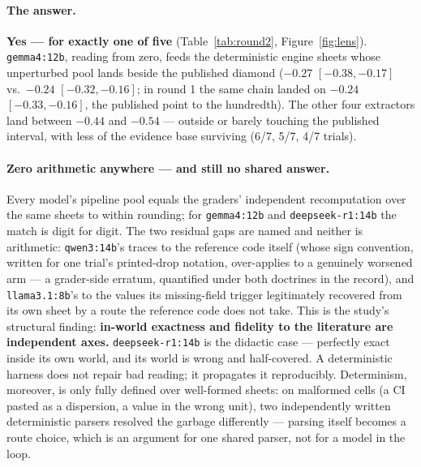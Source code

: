 \documentclass[11pt]{article}
\begin{document}
\paragraph{The answer.} \textbf{Yes --- for exactly one of five} (Table~\ref{tab:round2}, Figure~\ref{fig:lens}). \texttt{gemma4:12b}, reading from zero, feeds the deterministic engine sheets whose unperturbed pool lands beside the published diamond ($-0.27$ $[-0.38, -0.17]$ vs.\ $-0.24$ $[-0.32, -0.16]$; in round 1 the same chain landed on $-0.24$ $[-0.33, -0.16]$, the published point to the hundredth). The other four extractors land between $-0.44$ and $-0.54$ --- outside or barely touching the published interval, with less of the evidence base surviving (6/7, 5/7, 4/7 trials).

\paragraph{Zero arithmetic anywhere --- and still no shared answer.} Every model's pipeline pool equals the graders' independent recomputation over the same sheets to within rounding; for \texttt{gemma4:12b} and \texttt{deepseek-r1:14b} the match is digit for digit. The two residual gaps are named and neither is arithmetic: \texttt{qwen3:14b}'s traces to the reference code itself (whose sign convention, written for one trial's printed-drop notation, over-applies to a genuinely worsened arm --- a grader-side erratum, quantified under both doctrines in the record), and \texttt{llama3.1:8b}'s to the values its missing-field trigger legitimately recovered from its own sheet by a route the reference code does not take. This is the study's structural finding: \textbf{in-world exactness and fidelity to the literature are independent axes.} \texttt{deepseek-r1:14b} is the didactic case --- perfectly exact inside its own world, and its world is wrong and half-covered. A deterministic harness does not repair bad reading; it propagates it reproducibly. Determinism, moreover, is only fully defined over well-formed sheets: on malformed cells (a CI pasted as a dispersion, a value in the wrong unit), two independently written deterministic parsers resolved the garbage differently --- parsing itself becomes a route choice, which is an argument for one shared parser, not for a model in the loop.
\end{document}
